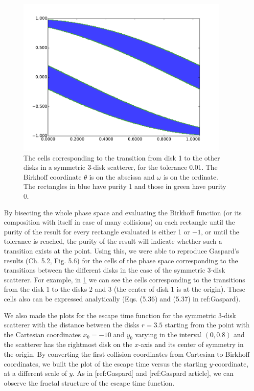 \documentclass[pre, amsmath, amssymb, onecolumn, showpacs]{revtex4-1}
\begin{document}
\begin{figure}
\centering
\includegraphics*[width=300pt]{birkhoff-12-and-13_tol=1e-2.pdf}
\caption{The cells corresponding to the transition from disk 1 to the other disks in a symmetric 3-disk scatterer, for the tolerance 0.01. The Birkhoff coordinate $\theta$ is on the abscissa and $\omega$ is on the ordinate. The rectangles in blue have purity 1 and those in green have purity 0.}
\label{fig01}
\end{figure}

By bisecting the whole phase space and evaluating the Birkhoff function (or its composition with itself in case of many collisions) on each rectangle until the purity of the result for every rectangle evaluated is either 1 or $-1$, or until the tolerance is reached, the purity of the result will indicate whether such a transition exists at the point. Using this, we were able to reproduce Gaspard's results (Ch. 5.2, Fig. 5.6) for the cells of the phase space corresponding to the transitions between the different disks in the case of the symmetric 3-disk scatterer. For example, in \ref{fig01} we can see the cells corresponding to the transitions from the disk 1 to the disks 2 and 3 (the center of disk 1 is at the origin). These cells also can be expressed analytically (Eqs. (5.36) and (5.37) in ref:Gaspard). 

We also made the plots for the escape time function for the symmetric 3-disk scatterer with the distance between the disks $r = 3.5$ starting from the point with the Cartesian coordinates $x_0 = -10$ and $y_0$ varying in the interval $(0, 0.8)$ and the scatterer has the rightmost disk on the $x$-axis and its center of symmetry in the origin. By converting the first collision coordinates from Cartesian to Birkhoff coordinates, we built the plot of the escape time versus the starting $y$-coordinate, at a different scale of $y$. As in [ref:Gaspard] and [ref:Gaspard article], we can observe the fractal structure of the escape time function.
\end{document}
